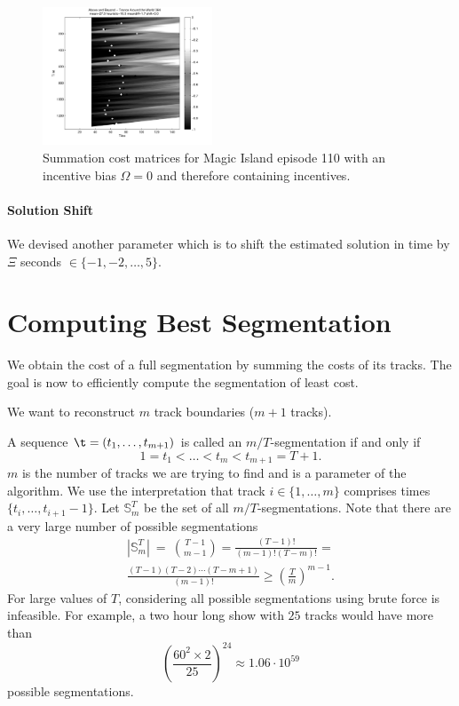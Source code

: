 \documentclass[twocolumn]{article}
\newcommand{\segs}{\mathbb S}
\begin{document}
		\begin{figure}
			\centering
			\includegraphics[width=0.45\textwidth]{images/cmsumib1}
			\caption{Summation cost matrices for Magic Island episode 110 with an incentive bias $\Omega=0$ and therefore containing incentives. }
			\label{fig:cmsumib2}
		\end{figure} 
		
		
	\paragraph{Solution Shift}
	
	We devised another parameter which is to shift the estimated solution in time by $\varXi$ seconds $\in \{-1,-2,\ldots,5\}$.
	
	\section{Computing Best Segmentation}\label{best_cost}
	
	We obtain the cost of a full segmentation by summing the costs of its tracks. The goal is now to efficiently compute the segmentation of least cost.
	
	We want to reconstruct $m$ track boundaries ($m+1$ tracks).
	
	A sequence $\t = (t_1, \ldots, t_{m+1})$ is called an $m/T$-segmentation if and only if
	\[
	1 = t_1 < \ldots < t_m < t_{m+1} = T+1.
	\]
	$m$ is the number of tracks we are trying to find and is a parameter of the algorithm. We use the interpretation that track $i \in \{1, \ldots, m\}$ comprises times $\{t_i, \ldots, t_{i+1}-1\}$. Let $\segs^T_m$ be the set of all $m/T$-segmentations. Note that there are a very large number of possible segmentations 
	\begin{multline*}
		|\segs^T_m| ~=~ \binom{T-1}{m-1}
		= \frac{(T-1)!}{(m-1)!(T-m)!} =\\
		\frac{(T-1)(T-2)\cdots(T-m+1)}{(m-1)!} \ge \left( \frac{T}{m}\right)^{m-1}.
	\end{multline*} 
	For large values of $T$, considering all possible segmentations using brute force is infeasible. For example, a two hour long show with $25$ tracks would have more than 
	\[
	\left( \frac{60^2 \times 2}{25}\right)^{24}  \approx 1.06 \cdot 10^{59}
	\] possible segmentations. 
	
\end{document}

